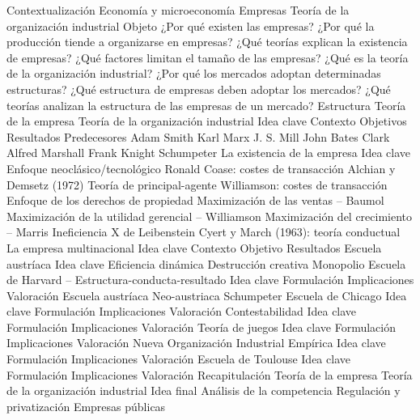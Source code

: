 \documentclass{nuevotema}
\begin{document}
\begin{esquema}[enumerate]
	\1[] 
		\2 Contextualización
			\3 Economía y microeconomía
			\3 Empresas
			\3 Teoría de la organización industrial
		\2 Objeto
			\3 ¿Por qué existen las empresas?
			\3 ¿Por qué la producción tiende a organizarse en empresas?
			\3 ¿Qué teorías explican la existencia de empresas?
			\3 ¿Qué factores limitan el tamaño de las empresas?
			\3 ¿Qué es la teoría de la organización industrial?
			\3 ¿Por qué los mercados adoptan determinadas estructuras?
			\3 ¿Qué estructura de empresas deben adoptar los mercados?
			\3 ¿Qué teorías analizan la estructura de las empresas de un mercado?
		\2 Estructura
			\3 Teoría de la empresa
			\3 Teoría de la organización industrial
	\1 
		\2 Idea clave
			\3 Contexto
			\3 Objetivos
			\3 Resultados
		\2 Predecesores
			\3 Adam Smith
			\3 Karl Marx
			\3 J. S. Mill
			\3 John Bates Clark
			\3 Alfred Marshall
			\3 Frank Knight
			\3 Schumpeter
		\2 La existencia de la empresa
			\3 Idea clave
			\3 Enfoque neoclásico/tecnológico
			\3 Ronald Coase: costes de transacción
			\3 Alchian y Demsetz (1972)
			\3 Teoría de principal-agente
			\3 Williamson: costes de transacción
			\3 Enfoque de los derechos de propiedad
			\3 Maximización de las ventas -- Baumol
			\3 Maximización de la utilidad gerencial -- Williamson
			\3 Maximización del crecimiento -- Marris
			\3 Ineficiencia X de Leibenstein
			\3 Cyert y March (1963): teoría conductual
			\3 La empresa multinacional
	\1 
		\2 Idea clave
			\3 Contexto
			\3 Objetivo
			\3 Resultados
		\2 Escuela austríaca
			\3 Idea clave
			\3 Eficiencia dinámica
			\3 Destrucción creativa
			\3 Monopolio
		\2 Escuela de Harvard -- Estructura-conducta-resultado
			\3 Idea clave
			\3 Formulación
			\3 Implicaciones
			\3 Valoración
		\2 Escuela austríaca
			\3 Neo-austriaca
			\3 Schumpeter
		\2 Escuela de Chicago
			\3 Idea clave
			\3 Formulación
			\3 Implicaciones
			\3 Valoración
		\2 Contestabilidad
			\3 Idea clave
			\3 Formulación
			\3 Implicaciones
			\3 Valoración
		\2 Teoría de juegos
			\3 Idea clave
			\3 Formulación
			\3 Implicaciones
			\3 Valoración
		\2 Nueva Organización Industrial Empírica
			\3 Idea clave
			\3 Formulación
			\3 Implicaciones
			\3 Valoración
		\2 Escuela de Toulouse
			\3 Idea clave
			\3 Formulación
			\3 Implicaciones
			\3 Valoración
	\1[] 
		\2 Recapitulación
			\3 Teoría de la empresa
			\3 Teoría de la organización industrial
		\2 Idea final
			\3 Análisis de la competencia
			\3 Regulación y privatización
			\3 Empresas públicas

\end{esquema}
\end{document}

